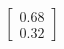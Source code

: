 \documentclass[preview]{standalone}
\begin{document}
\begin{align*}
\begin{bmatrix} 0.68 \\ 0.32 \end{bmatrix}
\end{align*}
\end{document}
